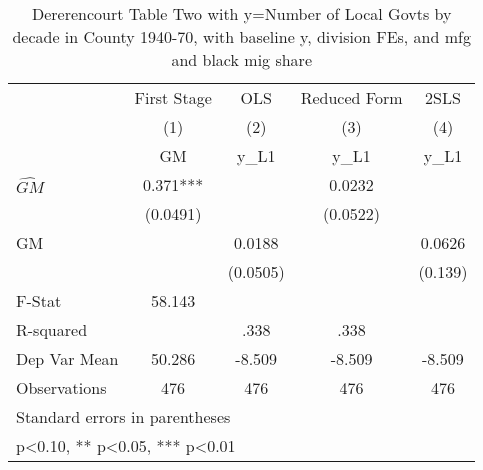 \begin{table}[htbp]\centering
\def\sym#1{\ifmmode^{#1}\else\(^{#1}\)\fi}
\caption{Dererencourt Table Two with y=Number of Local Govts by decade in County 1940-70, with baseline y, division FEs, and mfg and black mig share}
\begin{tabular}{l*{4}{c}}
\toprule
                    & First Stage   &         OLS   &Reduced Form   &        2SLS   \\
                    &\multicolumn{1}{c}{(1)}&\multicolumn{1}{c}{(2)}&\multicolumn{1}{c}{(3)}&\multicolumn{1}{c}{(4)}\\
                    &\multicolumn{1}{c}{GM}&\multicolumn{1}{c}{y\_L1}&\multicolumn{1}{c}{y\_L1}&\multicolumn{1}{c}{y\_L1}\\
\midrule
$\hat{GM}$          &       0.371***&               &      0.0232   &               \\
                    &    (0.0491)   &               &    (0.0522)   &               \\
\addlinespace
GM                  &               &      0.0188   &               &      0.0626   \\
                    &               &    (0.0505)   &               &     (0.139)   \\
\midrule
F-Stat              &      58.143   &               &               &               \\
R-squared           &               &        .338   &        .338   &               \\
Dep Var Mean        &      50.286   &      -8.509   &      -8.509   &      -8.509   \\
Observations        &         476   &         476   &         476   &         476   \\
\bottomrule
\multicolumn{5}{l}{\footnotesize Standard errors in parentheses}\\
\multicolumn{5}{l}{\footnotesize * p<0.10, ** p<0.05, *** p<0.01}\\
\end{tabular}
\end{table}

